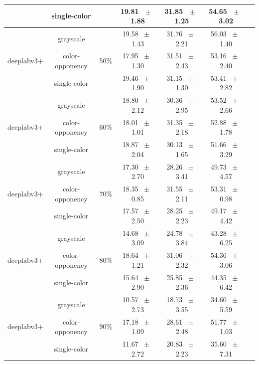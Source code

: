 \begin{table}[h]
\begin{tabular}{@{}lccc ccc@{}}
    & single-color &  & 19.81 ~$\pm$~ 1.88 & 31.85 ~$\pm$~ 1.25 & 54.65 ~$\pm$~ 3.02 \\
    \midrule
    \multirow{3}{*}{deeplabv3+} & grayscale & \multirow{3}{*}{50\%} & 19.58 ~$\pm$~ 1.43 & 31.76 ~$\pm$~ 2.21 & 56.03 ~$\pm$~ 1.40 \\
    & color-opponency &  & 17.95 ~$\pm$~ 1.30 & 31.51 ~$\pm$~ 2.43 & 53.16 ~$\pm$~ 2.40 \\
    & single-color &  & 19.46 ~$\pm$~ 1.90 & 31.15 ~$\pm$~ 1.30 & 53.41 ~$\pm$~ 2.82 \\
    \midrule
    \multirow{3}{*}{deeplabv3+} & grayscale & \multirow{3}{*}{60\%} & 18.80 ~$\pm$~ 2.12 & 30.36 ~$\pm$~ 2.95 & 53.52 ~$\pm$~ 2.66 \\
    & color-opponency &  & 18.01 ~$\pm$~ 1.01 & 31.35 ~$\pm$~ 2.18 & 52.88 ~$\pm$~ 1.78 \\
    & single-color &  & 18.87 ~$\pm$~ 2.04 & 30.13 ~$\pm$~ 1.65 & 51.66 ~$\pm$~ 3.29 \\
    \midrule
    \multirow{3}{*}{deeplabv3+} & grayscale & \multirow{3}{*}{70\%} & 17.30 ~$\pm$~ 2.70 & 28.26 ~$\pm$~ 3.41 & 49.73 ~$\pm$~ 4.57 \\
    & color-opponency &  & 18.35 ~$\pm$~ 0.85 & 31.55 ~$\pm$~ 2.11 & 53.31 ~$\pm$~ 0.98 \\
    & single-color &  & 17.57 ~$\pm$~ 2.50 & 28.25 ~$\pm$~ 2.23 & 49.17 ~$\pm$~ 4.42 \\
    \midrule
    \multirow{3}{*}{deeplabv3+} & grayscale & \multirow{3}{*}{80\%} & 14.68 ~$\pm$~ 3.09 & 24.78 ~$\pm$~ 3.84 & 43.28 ~$\pm$~ 6.25 \\
    & color-opponency &  & 18.64 ~$\pm$~ 1.21 & 31.06 ~$\pm$~ 2.32 & 54.36 ~$\pm$~ 3.06 \\
    & single-color &  & 15.64 ~$\pm$~ 2.90 & 25.85 ~$\pm$~ 2.36 & 44.35 ~$\pm$~ 6.42 \\
    \midrule
    \multirow{3}{*}{deeplabv3+} & grayscale & \multirow{3}{*}{90\%} & 10.57 ~$\pm$~ 2.73 & 18.73 ~$\pm$~ 3.55 & 34.60 ~$\pm$~ 5.59 \\
    & color-opponency &  & 17.18 ~$\pm$~ 1.09 & 28.61 ~$\pm$~ 2.48 & 51.77 ~$\pm$~ 1.03 \\
    & single-color &  & 11.67 ~$\pm$~ 2.72 & 20.83 ~$\pm$~ 2.23 & 35.60 ~$\pm$~ 7.31 \\
    \midrule
    \bottomrule
  \end{tabular}
  \label{tab:sparse_results_deeplabv3+_acdc_night}
\end{table}